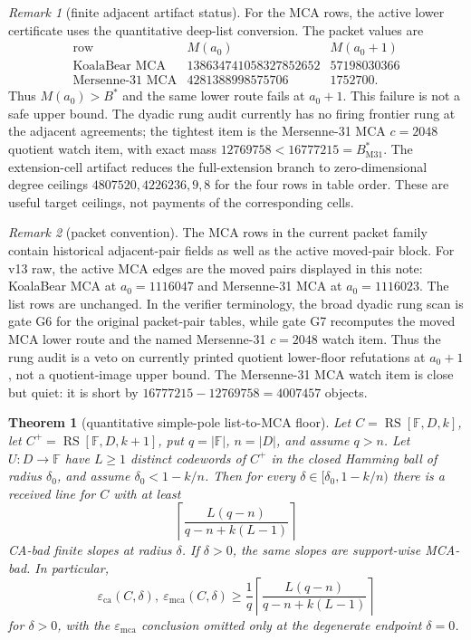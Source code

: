\documentclass[a4paper,11pt]{amsart}
\newtheorem{theorem}{Theorem}[section]
\theoremstyle{remark}
\newtheorem{remark}[remark]{Remark}
\newcommand{\F}{\mathbb F}
\newcommand{\RS}{\operatorname{RS}}
\newcommand{\emca}{\varepsilon_{\mathrm{mca}}}
\newcommand{\eca}{\varepsilon_{\mathrm{ca}}}
\begin{document}
\begin{remark}[finite adjacent artifact status]\label{rem:finite-artifacts}
For the MCA rows, the active lower certificate uses the quantitative deep-list conversion.  The packet values are
\[
\begin{array}{c|cc}
\text{row} & M(a_0) & M(a_0+1)\\
\hline
\text{KoalaBear MCA} & 138634741058327852652 & 57198030366\\
\text{Mersenne-31 MCA} & 4281388998575706 & 1752700 .
\end{array}
\]
Thus \(M(a_0)>B^*\) and the same lower route fails at \(a_0+1\).  This failure is not a safe upper bound.  The dyadic rung audit currently has no firing frontier rung at the adjacent agreements; the tightest item is the Mersenne-31 MCA \(c=2048\) quotient watch item, with exact mass \(12769758<16777215=B^*_{\mathrm{M31}}\).  The extension-cell artifact reduces the full-extension branch to zero-dimensional degree ceilings \(4807520,4226236,9,8\) for the four rows in table order.  These are useful target ceilings, not payments of the corresponding cells.
\end{remark}

\begin{remark}[packet convention]\label{rem:packet-convention}
The MCA rows in the current packet family contain historical adjacent-pair fields as well as the active moved-pair block.  For v13 raw, the active MCA edges are the moved pairs displayed in this note: KoalaBear MCA at \(a_0=1116047\) and Mersenne-31 MCA at \(a_0=1116023\).  The list rows are unchanged.  In the verifier terminology, the broad dyadic rung scan is gate G6 for the original packet-pair tables, while gate G7 recomputes the moved MCA lower route and the named Mersenne-31 \(c=2048\) watch item.  Thus the rung audit is a veto on currently printed quotient lower-floor refutations at \(a_0+1\), not a quotient-image upper bound.  The Mersenne-31 MCA watch item is close but quiet: it is short by \(16777215-12769758=4007457\) objects.
\end{remark}

\begin{theorem}[quantitative simple-pole list-to-MCA floor]\label{thm:simple-pole-list-floor}
Let \(C=\RS[\F,D,k]\), let \(C^+=\RS[\F,D,k+1]\), put \(q=|\F|\), \(n=|D|\), and assume \(q>n\).  Let \(U:D\to\F\) have \(L\ge1\) distinct codewords of \(C^+\) in the closed Hamming ball of radius \(\delta_0\), and assume \(\delta_0<1-k/n\).  Then for every \(\delta\in[\delta_0,1-k/n)\) there is a received line for \(C\) with at least
\[
        \left\lceil \frac{L(q-n)}{q-n+k(L-1)}\right\rceil
\]
CA-bad finite slopes at radius \(\delta\).  If \(\delta>0\), the same slopes are support-wise MCA-bad.  In particular,
\[
        \eca(C,\delta),\ \emca(C,\delta)
        \ge
        \frac{1}{q}
        \left\lceil \frac{L(q-n)}{q-n+k(L-1)}\right\rceil
\]
for \(\delta>0\), with the \(\emca\) conclusion omitted only at the degenerate endpoint \(\delta=0\).
\end{theorem}
\end{document}

